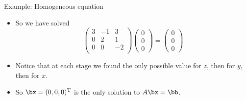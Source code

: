 \documentclass{beamer}
\begin{document}
\begin{frame}{Example: Homogeneous equation}

\begin{itemize}
\item So we have solved
$$
\begin{pmatrix}
3 & -1  & 3 \\
0 & 2  & 1 \\
0 & 0 & -2 \\
\end{pmatrix}
\begin{pmatrix}
0 \\ 0 \\ 0
\end{pmatrix}
=
\begin{pmatrix}
0 \\ 0 \\ 0
\end{pmatrix}
$$
\item Notice that at each stage we found the only possible value for $z$,
then for $y$, then for $x$.
\item So $\bx=(0,0,0)^{\text{T}}$ is the only solution to $A\bx=\bb$.
\end{itemize}


\end{frame}
\end{document}
